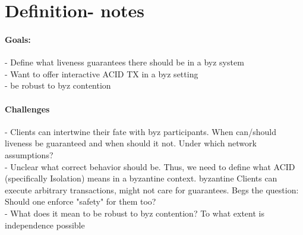 \section{Definition- notes}

\paragraph{Goals:}

- Define what liveness guarantees there should be in a byz system\\
- Want to offer interactive ACID TX in a byz setting \\
- be robust to byz contention\\


\paragraph{Challenges}
- Clients can intertwine their fate with byz participants. When can/should liveness be guaranteed and when should it not. Under which network assumptions?\\
-  Unclear what correct behavior should be. Thus, we need to define what ACID (specifically Isolation) means in a byzantine context. byzantine Clients can execute arbitrary transactions, might not care for guarantees. Begs the question: Should one enforce "safety" for them too?\\
- What does it mean to be robust to byz contention? To what extent is independence possible